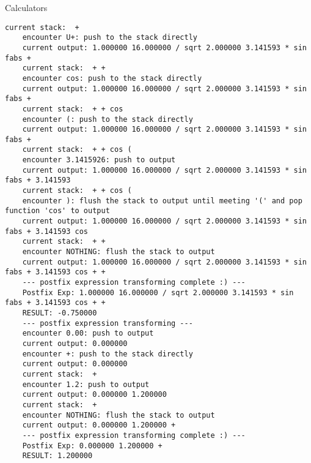 \begin{homeworkProblem}{Calculators}
\begin{lstlisting}[breaklines=true]
    current stack:  +
    encounter U+: push to the stack directly
    current output: 1.000000 16.000000 / sqrt 2.000000 3.141593 * sin fabs +
    current stack:  + +
    encounter cos: push to the stack directly
    current output: 1.000000 16.000000 / sqrt 2.000000 3.141593 * sin fabs +
    current stack:  + + cos
    encounter (: push to the stack directly
    current output: 1.000000 16.000000 / sqrt 2.000000 3.141593 * sin fabs +
    current stack:  + + cos (
    encounter 3.1415926: push to output
    current output: 1.000000 16.000000 / sqrt 2.000000 3.141593 * sin fabs + 3.141593
    current stack:  + + cos (
    encounter ): flush the stack to output until meeting '(' and pop function 'cos' to output
    current output: 1.000000 16.000000 / sqrt 2.000000 3.141593 * sin fabs + 3.141593 cos
    current stack:  + +
    encounter NOTHING: flush the stack to output
    current output: 1.000000 16.000000 / sqrt 2.000000 3.141593 * sin fabs + 3.141593 cos + +
    --- postfix expression transforming complete :) ---
    Postfix Exp: 1.000000 16.000000 / sqrt 2.000000 3.141593 * sin fabs + 3.141593 cos + +
    RESULT: -0.750000
    --- postfix expression transforming ---
    encounter 0.00: push to output
    current output: 0.000000
    encounter +: push to the stack directly
    current output: 0.000000
    current stack:  +
    encounter 1.2: push to output
    current output: 0.000000 1.200000
    current stack:  +
    encounter NOTHING: flush the stack to output
    current output: 0.000000 1.200000 +
    --- postfix expression transforming complete :) ---
    Postfix Exp: 0.000000 1.200000 +
    RESULT: 1.200000
    \end{lstlisting}

\end{homeworkProblem}


